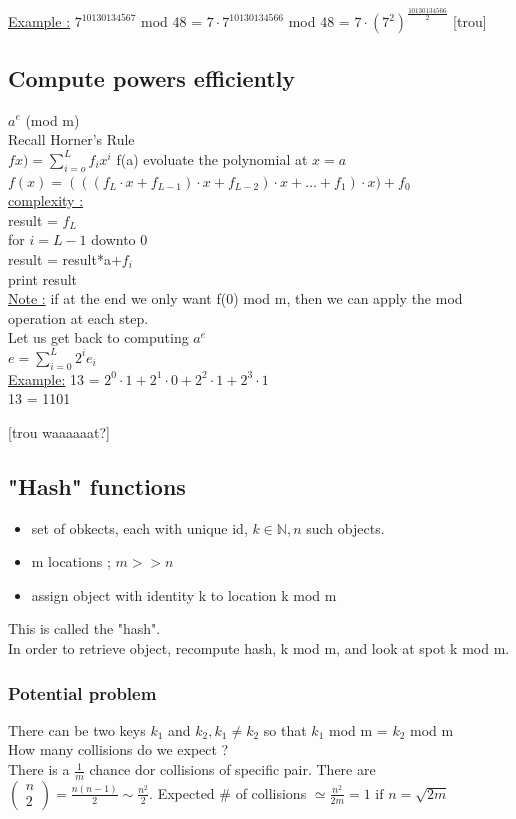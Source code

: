\documentclass[12pt,a4paper]{article}
\begin{document}
\underline{Example :} $7^{10130134567}$ mod 48 = $7\cdot 7^{10130134566}$ mod 48 = $7\cdot (7^2)^{\frac{10130134566}{2}}$ [trou]

\subsection{Compute powers efficiently}
$a^e$ (mod m)\\
Recall Horner's Rule\\
$fx)=\sum_{i=o}^{L}f_ix^i$  f(a) evoluate the polynomial at $x=a$\\
$f(x)=(((f_L\cdot x + f_{L-1})\cdot x + f_{L-2})\cdot x +... + f_1)\cdot x) + f_0$\\
\underline{complexity :}\\
result = $f_L$\\
for $i = L-1$ downto 0{\\
result = result*a+$f_i$}\\
print result\\
\underline{Note :} if at the end we only want f(0) mod m, then we can apply the mod operation at each step.\\
Let us get back to computing $a^e$\\
$e = \sum_{i=0}^L 2^ie_i$\\
\underline{Example:} 13 = $2^0\cdot 1 + 2^1\cdot 0 + 2^2 \cdot 1 + 2^3 \cdot 1$\\
13 = 1101

[trou waaaaaat?]

\subsection{"Hash" functions}
\begin{itemize}
\item set of obkects, each with unique id, $k \in \mathbb{N}, n$ such objects.
\item m locations ; $m >> n$
\item assign object with identity k to location k mod m
\end{itemize}
This is called the "hash".\\
In order to retrieve object, recompute hash, k mod m, and look at spot k mod m.

\subsubsection{Potential problem}
There can be two keys $k_1$ and $k_2, k_1 \neq k_2$ so that $k_1$ mod m = $k_2$ mod m\\
How many collisions do we expect ?	\\
There is a $\frac{1}{m}$ chance dor collisions of specific pair. There are 
$\begin{pmatrix}
n\\
2
\end{pmatrix}
= \frac{n(n-1)}{2} \sim \frac{n^2}{2}$. Expected \# of collisions $\simeq \frac{n^2}{2m} = 1 \text{ if } n =\sqrt{2m}$
\end{document}
